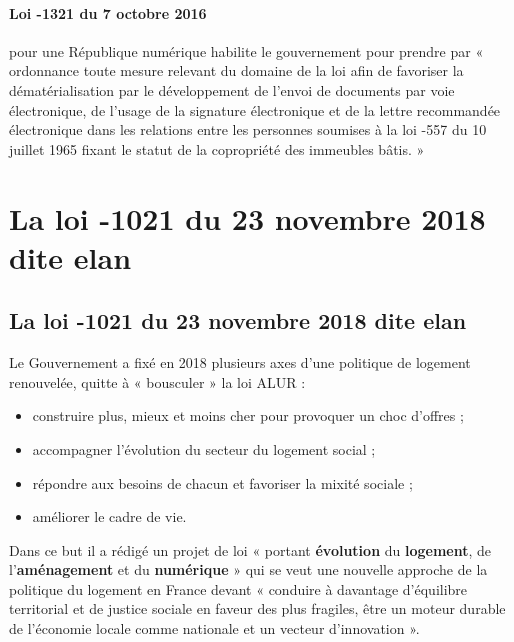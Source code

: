 			\paragraph{Loi -1321 du 7 octobre 2016} pour une République numérique habilite le gouvernement pour prendre par « ordonnance toute mesure relevant du domaine de la loi afin de favoriser la dématérialisation par le développement de l'envoi de documents par voie électronique, de l'usage de la signature électronique et de la lettre recommandée électronique dans les relations entre les personnes soumises à la loi -557 du 10 juillet 1965 fixant le statut de la copropriété des immeubles bâtis. »
	
	\section{La loi -1021 du 23 novembre 2018 dite elan}
		\subsection{La loi -1021 du 23 novembre 2018 dite elan}
			Le Gouvernement a fixé en 2018 plusieurs axes d'une politique de logement renouvelée, quitte à « bousculer » la loi ALUR :
			\begin{itemize}
				\item construire plus, mieux et moins cher pour provoquer un choc d'offres ;
				\item  accompagner l'évolution du secteur du logement social ;
				\item répondre aux besoins de chacun et favoriser la mixité sociale ;
				\item améliorer le cadre de vie.
			\end{itemize}
			Dans ce but il a rédigé un projet de loi « portant \textbf{évolution} du \textbf{logement}, de l’\textbf{aménagement} et du \textbf{numérique} » qui se veut une nouvelle approche de la politique du logement en France devant « conduire à davantage d’équilibre territorial et de justice sociale en faveur des plus fragiles, être un moteur durable de l’économie locale comme nationale et un vecteur d’innovation ».
			
